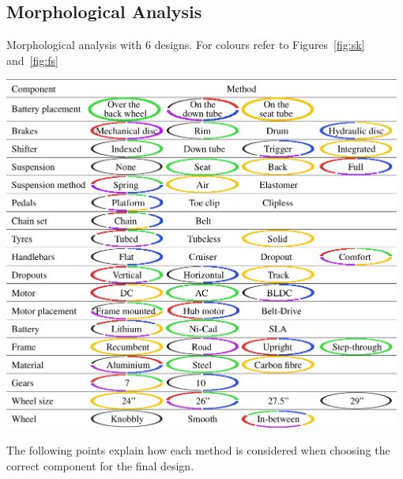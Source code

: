 \documentclass[a4paper,11pt]{article}
\begin{document}
\subsection{Morphological Analysis}

\begin{table}[!ht]
	\centering
	\caption{Morphological analysis with 6 designs. For colours refer to Figures~\ref{fig:sk} and~\ref{fig:fs}}
	\includegraphics[width=0.98\textwidth]{morph}
\end{table}

The following points explain how each method is considered when choosing the correct component for the final design.
\end{document}
